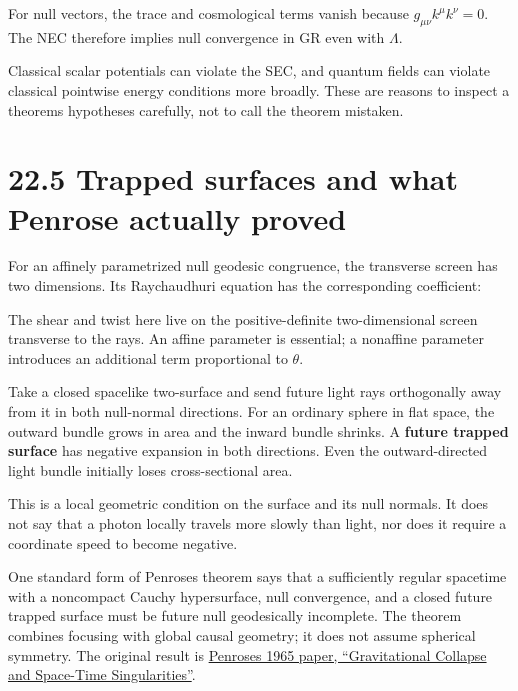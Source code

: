 \documentclass[
  11pt,
  letterpaper,
  oneside,
  openany]{scrbook}
\begin{document}
For null vectors, the trace and cosmological terms vanish because
\(g_{\mu\nu}k^\mu k^\nu=0\). The NEC therefore implies null convergence
in GR even with \(\Lambda\).

Classical scalar potentials can violate the SEC, and quantum fields can
violate classical pointwise energy conditions more broadly. These are
reasons to inspect a theorem\textquotesingle s hypotheses carefully, not
to call the theorem mistaken.

\hypertarget{trapped-surfaces-and-what-penrose-actually-proved}{%
\section{22.5 Trapped surfaces and what Penrose actually
proved}\label{trapped-surfaces-and-what-penrose-actually-proved}}

For an affinely parametrized null geodesic congruence, the transverse
screen has two dimensions. Its Raychaudhuri equation has the
corresponding coefficient:

\begin{center}
\begingroup
{}
\ifdim\wd\grmathbox>\linewidth
\resizebox{\linewidth}{!}{\usebox{\grmathbox}}
\else\usebox{\grmathbox}\fi
\endgroup
\end{center}

The shear and twist here live on the positive-definite two-dimensional
screen transverse to the rays. An affine parameter is essential; a
nonaffine parameter introduces an additional term proportional to
\(\theta\).

Take a closed spacelike two-surface and send future light rays
orthogonally away from it in both null-normal directions. For an
ordinary sphere in flat space, the outward bundle grows in area and the
inward bundle shrinks. A \textbf{future trapped surface} has negative
expansion in both directions. Even the outward-directed light bundle
initially loses cross-sectional area.

This is a local geometric condition on the surface and its null normals.
It does not say that a photon locally travels more slowly than light,
nor does it require a coordinate speed to become negative.

One standard form of Penrose\textquotesingle s theorem says that a
sufficiently regular spacetime with a noncompact Cauchy hypersurface,
null convergence, and a closed future trapped surface must be future
null geodesically incomplete. The theorem combines focusing with global
causal geometry; it does not assume spherical symmetry. The original
result is
\href{https://link.aps.org/doi/10.1103/PhysRevLett.14.57}{Penrose\textquotesingle s
1965 paper, ``Gravitational Collapse and Space-Time Singularities''}.
\end{document}
